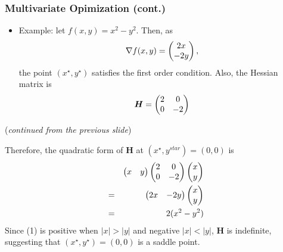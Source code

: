 \documentclass[pdflatex, 12pt]{beamer}
\begin{document}
\begin{frame}
\frametitle{Multivariate Opimization (cont.)}
\begin{itemize}
\item Example: let $f(x, y) = x^2 - y^2$. Then, as
 \begin{equation}
 \nabla f(x, y) = \begin{pmatrix}
 2x \\
 -2y \\
 \end{pmatrix}, \notag
 \end{equation} 
the point $(x^{\star}, y^{\star})$ satisfies the first order condition. Also, the Hessian matrix is
 \begin{equation}
 \bm{H} = \begin{pmatrix}
 2 & 0 \\
 0 & -2 \\
 \end{pmatrix} \notag
 \end{equation}
\end{itemize}
\end{frame}

\begin{frame}
(\emph{continued from the previous slide})

\vspace{0.4cm}
Therefore, the quadratic form of $\bm{H}$ at $(x^{\star}, y^{star}) = (0, 0)$ is
 \begin{eqnarray}
 && \begin{pmatrix}
 x & y \\
 \end{pmatrix} \begin{pmatrix}
 2 & 0 \\
 0 & -2 \\
 \end{pmatrix} \begin{pmatrix}
 x \\
 y \\
 \end{pmatrix} \notag \\
 &=& \begin{pmatrix}
 2x & -2y
 \end{pmatrix} \begin{pmatrix}
 x \\
 y \\
 \end{pmatrix} \notag \\
 &=& 2(x^2 - y^2)
 \end{eqnarray}
Since (1) is positive when $|x| > |y|$ and negative $|x| < |y|$, $\bm{H}$ is indefinite, suggesting that $(x^{\star}, y^{\star}) = (0, 0)$ is a saddle point.
\end{frame}
\end{document}
